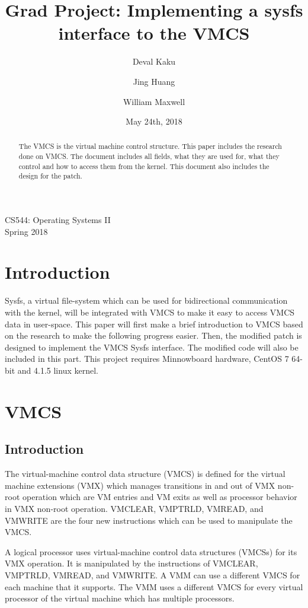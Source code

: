 \documentclass[onecolumn, draftclsnofoot,10pt, compsoc]{IEEEtran}
\title{Grad Project: Implementing a sysfs interface to the VMCS}
\author{
  Deval Kaku \hspace{1cm}
  \and
  Jing Huang \hspace{1cm}
  \and
  William Maxwell
}
\date{May 24th, 2018}
\begin{document}
\begin{titlepage}

\maketitle
\begin{center}
CS544: Operating Systems II \\
Spring 2018
\vspace{50 mm}
\end{center}
\begin{abstract}
The VMCS is the virtual machine control structure. This paper includes the research done on VMCS. The document includes all fields, what they are used for, what they control and how to access them from the kernel. This document also includes the design for the patch.
\end{abstract}
\end{titlepage}
\newpage
\tableofcontents
\newpage
\section{Introduction}
Sysfs, a virtual file-system which can be used for bidirectional communication with the kernel, will be integrated with VMCS to make it easy to access VMCS data in user-space. This paper will first make a brief introduction to VMCS based on the research to make the following progress easier. Then, the modified patch is designed to implement the VMCS Sysfs interface. The modified code will also be included in this part. This project requires Minnowboard hardware, CentOS 7 64-bit and 4.1.5 linux kernel.

\section{VMCS}
\subsection{Introduction}
The virtual-machine control data structure (VMCS) is defined for the virtual machine extensions (VMX) which manages transitions in and out of VMX non-root operation which are VM entries and VM exits as well as processor behavior in VMX non-root operation. VMCLEAR, VMPTRLD, VMREAD, and VMWRITE are the four new instructions which can be used to manipulate the VMCS. 

A logical processor uses virtual-machine control data structures (VMCSs) for its VMX operation. It is manipulated by the instructions of VMCLEAR, VMPTRLD, VMREAD, and VMWRITE. A VMM can use a different VMCS for each machine that it supports. The VMM uses a different VMCS for every virtual processor of the virtual machine which has multiple processors.
\end{document}
